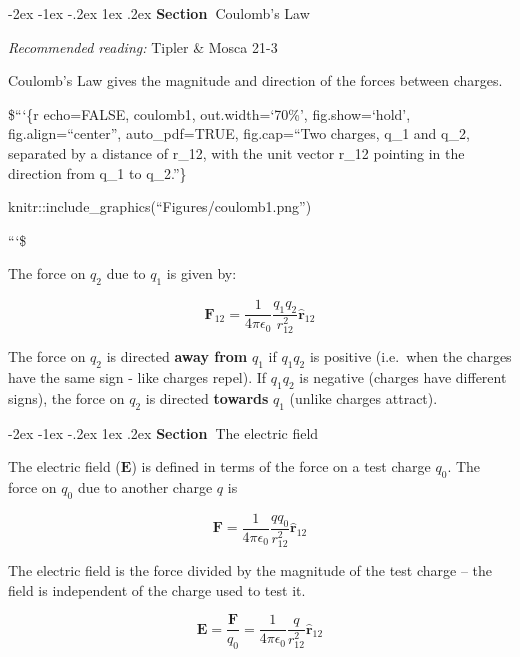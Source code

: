 \documentclass[
]{book}
\makeatletter
\renewcommand\section{%
\@startsection{section}{1}{\z@}%
              {-2ex \@plus -1ex \@minus -.2ex}%
              {1ex \@plus .2ex}%
              {\sffamily\bfseries\large\noindent Section~}}
\makeatother
\begin{document}
\hypertarget{coulombs-law}{%
\section{Coulomb's Law}\label{coulombs-law}}

\emph{Recommended reading:} Tipler \& Mosca 21-3

Coulomb's Law gives the magnitude and direction of the forces between
charges.

\$```\{r echo=FALSE, coulomb1, out.width=`70\%', fig.show=`hold', fig.align=``center'', auto\_pdf=TRUE, fig.cap=``Two charges, q\_1 and q\_2, separated by a distance of r\_12, with the unit vector r\_12 pointing in the direction from q\_1 to q\_2.''\}

knitr::include\_graphics(``Figures/coulomb1.png'')

```\$

The force on \(q_2\) due to \(q_1\) is given by:

\begin{equation}
\label{eq:coulombs}
\mathbf{F}_{12}= \frac{1}{4\pi \epsilon_0} \frac{q_1 q_2}{r_{12}^2} \hat{\mathbf{r}}_{12}
\end{equation}

The force on \(q_2\) is directed \textbf{away from} \(q_1\) if \(q_1 q_2\) is
positive (i.e.~when the charges have the same sign - like charges
repel). If \(q_1 q_2\) is negative (charges have different signs), the
force on \(q_2\) is directed \textbf{towards} \(q_1\) (unlike charges attract).

\hypertarget{the-electric-field}{%
\section{The electric field}\label{the-electric-field}}

The electric field (\(\mathbf{E}\)) is defined in terms of the force on a test
charge \(q_0\). The force on \(q_0\) due to another charge \(q\) is

\begin{equation}
\label{eq:forceQ0}
\mathbf{F} = \frac{1}{4\pi \epsilon_0} \frac{q q_0}{r_{12}^2} \hat{\mathbf{r}}_{12}
\end{equation}

The electric field is the force divided by the magnitude of the test
charge -- the field is independent of the charge used to test it.

\begin{equation}
\label{eq:fieldQ}
\mathbf{E} = \frac{\mathbf{F}}{q_0} = \frac{1}{4\pi \epsilon_0} \frac{q}{r_{12}^2} \hat{\mathbf{r}}_{12}
\end{equation}
\end{document}
